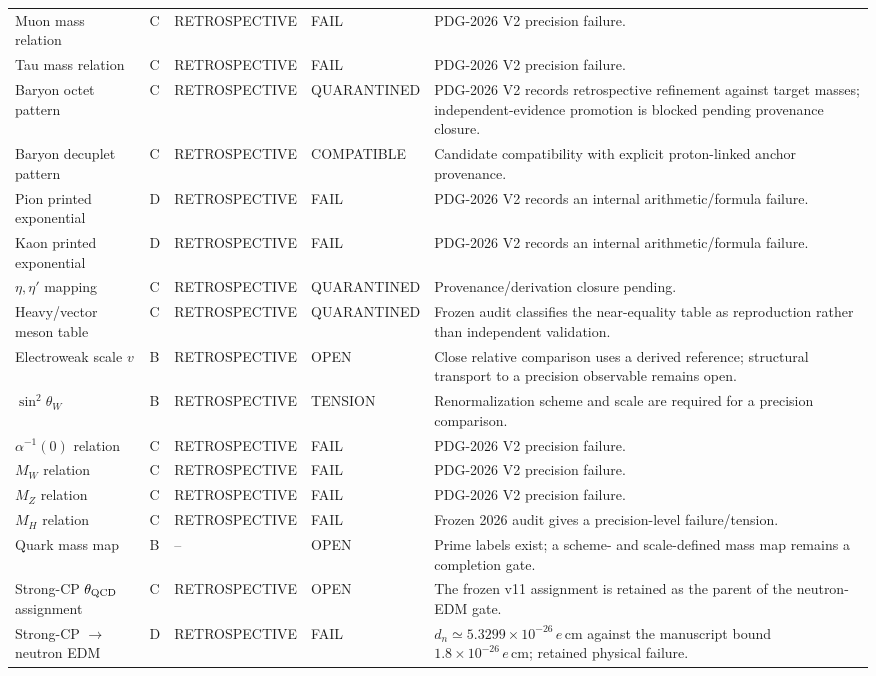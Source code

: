 {\begin{longtable}{p{}p{}p{}p{}p{}}
Muon mass relation & C & RETROSPECTIVE & FAIL & PDG-2026 V2 precision failure. \\
Tau mass relation & C & RETROSPECTIVE & FAIL & PDG-2026 V2 precision failure. \\
\midrule
Baryon octet pattern & C & RETROSPECTIVE & QUARANTINED & PDG-2026 V2 records retrospective refinement against target masses; independent-evidence promotion is blocked pending provenance closure. \\
Baryon decuplet pattern & C & RETROSPECTIVE & COMPATIBLE & Candidate compatibility with explicit proton-linked anchor provenance. \\
Pion printed exponential & D & RETROSPECTIVE & FAIL & PDG-2026 V2 records an internal arithmetic/formula failure. \\
Kaon printed exponential & D & RETROSPECTIVE & FAIL & PDG-2026 V2 records an internal arithmetic/formula failure. \\
$\eta,\eta'$ mapping & C & RETROSPECTIVE & QUARANTINED & Provenance/derivation closure pending. \\
Heavy/vector meson table & C & RETROSPECTIVE & QUARANTINED & Frozen audit classifies the near-equality table as reproduction rather than independent validation. \\
\midrule
Electroweak scale $v$ & B & RETROSPECTIVE & OPEN & Close relative comparison uses a derived reference; structural transport to a precision observable remains open. \\
$\sin^2\theta_W$ & B & RETROSPECTIVE & TENSION & Renormalization scheme and scale are required for a precision comparison. \\
$\alpha^{-1}(0)$ relation & C & RETROSPECTIVE & FAIL & PDG-2026 V2 precision failure. \\
$M_W$ relation & C & RETROSPECTIVE & FAIL & PDG-2026 V2 precision failure. \\
$M_Z$ relation & C & RETROSPECTIVE & FAIL & PDG-2026 V2 precision failure. \\
$M_H$ relation & C & RETROSPECTIVE & FAIL & Frozen 2026 audit gives a precision-level failure/tension. \\
Quark mass map & B & -- & OPEN & Prime labels exist; a scheme- and scale-defined mass map remains a completion gate. \\
\midrule
Strong-CP $\theta_{\rm QCD}$ assignment & C & RETROSPECTIVE & OPEN & The frozen v11 assignment is retained as the parent of the neutron-EDM gate. \\
Strong-CP $\to$ neutron EDM & D & RETROSPECTIVE & FAIL & $d_n\simeq5.3299\times10^{-26}\,e\,\mathrm{cm}$ against the manuscript bound $1.8\times10^{-26}\,e\,\mathrm{cm}$; retained physical failure. \\

\end{longtable}}
